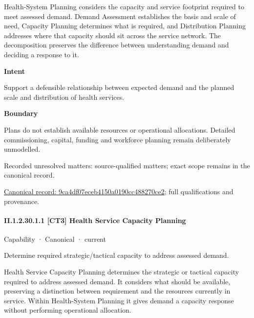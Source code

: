 Health-System Planning considers the capacity and service footprint required to meet assessed demand. Demand Assessment establishes the basis and scale of need, Capacity Planning determines what is required, and Distribution Planning addresses where that capacity should sit across the service network. The decomposition preserves the difference between understanding demand and deciding a response to it.



\textbf{Intent}



Support a defensible relationship between expected demand and the planned scale and distribution of health services.



\textbf{Boundary}



Plans do not establish available resources or operational allocations. Detailed commissioning, capital, funding and workforce planning remain deliberately unmodelled.


{\small Recorded unresolved matters: source-qualified matters; exact scope remains in the canonical record.}\par
{\footnotesize \href{../../../../continuum/strategy/capability/9ca4df07eceb4150a0190cc488270ce2.md}{Canonical record: 9ca4df07eceb4150a0190cc488270ce2}; full qualifications and provenance.}\par
\paragraph*{II.1.2.30.1.1 [CT3] Health Service Capacity Planning}
\label{navigation:II.1.2.30.1.1}

\label{element:c1d1db0e2c854077a41721615e86119d}
{\small Capability · Canonical · current}\par

Determine required strategic/tactical capacity to address assessed demand.



Health Service Capacity Planning determines the strategic or tactical capacity required to address assessed demand. It considers what should be available, preserving a distinction between requirement and the resources currently in service. Within Health-System Planning it gives demand a capacity response without performing operational allocation.



